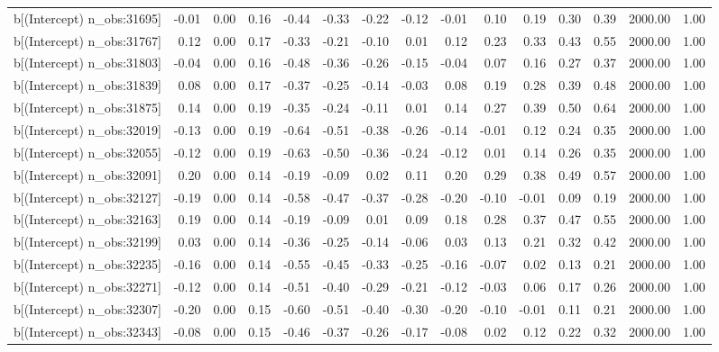 \begin{table}[ht]
\begin{tabular}{rrrrrrrrrrrrrrr}
  b[(Intercept) n\_obs:31695] & -0.01 & 0.00 & 0.16 & -0.44 & -0.33 & -0.22 & -0.12 & -0.01 & 0.10 & 0.19 & 0.30 & 0.39 & 2000.00 & 1.00 \\ 
  b[(Intercept) n\_obs:31767] & 0.12 & 0.00 & 0.17 & -0.33 & -0.21 & -0.10 & 0.01 & 0.12 & 0.23 & 0.33 & 0.43 & 0.55 & 2000.00 & 1.00 \\ 
  b[(Intercept) n\_obs:31803] & -0.04 & 0.00 & 0.16 & -0.48 & -0.36 & -0.26 & -0.15 & -0.04 & 0.07 & 0.16 & 0.27 & 0.37 & 2000.00 & 1.00 \\ 
  b[(Intercept) n\_obs:31839] & 0.08 & 0.00 & 0.17 & -0.37 & -0.25 & -0.14 & -0.03 & 0.08 & 0.19 & 0.28 & 0.39 & 0.48 & 2000.00 & 1.00 \\ 
  b[(Intercept) n\_obs:31875] & 0.14 & 0.00 & 0.19 & -0.35 & -0.24 & -0.11 & 0.01 & 0.14 & 0.27 & 0.39 & 0.50 & 0.64 & 2000.00 & 1.00 \\ 
  b[(Intercept) n\_obs:32019] & -0.13 & 0.00 & 0.19 & -0.64 & -0.51 & -0.38 & -0.26 & -0.14 & -0.01 & 0.12 & 0.24 & 0.35 & 2000.00 & 1.00 \\ 
  b[(Intercept) n\_obs:32055] & -0.12 & 0.00 & 0.19 & -0.63 & -0.50 & -0.36 & -0.24 & -0.12 & 0.01 & 0.14 & 0.26 & 0.35 & 2000.00 & 1.00 \\ 
  b[(Intercept) n\_obs:32091] & 0.20 & 0.00 & 0.14 & -0.19 & -0.09 & 0.02 & 0.11 & 0.20 & 0.29 & 0.38 & 0.49 & 0.57 & 2000.00 & 1.00 \\ 
  b[(Intercept) n\_obs:32127] & -0.19 & 0.00 & 0.14 & -0.58 & -0.47 & -0.37 & -0.28 & -0.20 & -0.10 & -0.01 & 0.09 & 0.19 & 2000.00 & 1.00 \\ 
  b[(Intercept) n\_obs:32163] & 0.19 & 0.00 & 0.14 & -0.19 & -0.09 & 0.01 & 0.09 & 0.18 & 0.28 & 0.37 & 0.47 & 0.55 & 2000.00 & 1.00 \\ 
  b[(Intercept) n\_obs:32199] & 0.03 & 0.00 & 0.14 & -0.36 & -0.25 & -0.14 & -0.06 & 0.03 & 0.13 & 0.21 & 0.32 & 0.42 & 2000.00 & 1.00 \\ 
  b[(Intercept) n\_obs:32235] & -0.16 & 0.00 & 0.14 & -0.55 & -0.45 & -0.33 & -0.25 & -0.16 & -0.07 & 0.02 & 0.13 & 0.21 & 2000.00 & 1.00 \\ 
  b[(Intercept) n\_obs:32271] & -0.12 & 0.00 & 0.14 & -0.51 & -0.40 & -0.29 & -0.21 & -0.12 & -0.03 & 0.06 & 0.17 & 0.26 & 2000.00 & 1.00 \\ 
  b[(Intercept) n\_obs:32307] & -0.20 & 0.00 & 0.15 & -0.60 & -0.51 & -0.40 & -0.30 & -0.20 & -0.10 & -0.01 & 0.11 & 0.21 & 2000.00 & 1.00 \\ 
  b[(Intercept) n\_obs:32343] & -0.08 & 0.00 & 0.15 & -0.46 & -0.37 & -0.26 & -0.17 & -0.08 & 0.02 & 0.12 & 0.22 & 0.32 & 2000.00 & 1.00 \\ 

\end{tabular}
\end{table}
